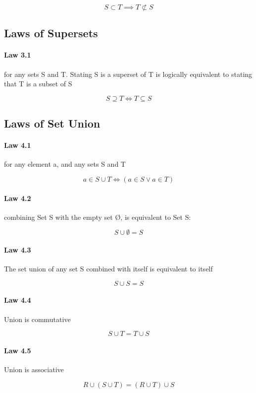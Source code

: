 \documentclass[twocolumn]{article}
\begin{document}
$$ S \subset T \implies T\not\subset S $$

\subsection{Laws of Supersets}

\paragraph{Law 3.1} for any sets S and T. Stating S is a superset of T is logically equivalent to stating that T is a subset of S

$$ S  \supseteq  T \iff T  \subseteq  S $$

\subsection{Laws of Set Union}

\paragraph{Law 4.1} for any element a, and any sets S and T

$$ a  \in  S  \cup  T \iff (a  \in  S \vee a  \in  T) $$

\paragraph{Law 4.2} combining Set S with the empty set Ø, is equivalent to Set S:

$$ S \cup  \emptyset =S $$

\paragraph{Law 4.3} The set union of any set S combined with itself is equivalent to itself

$$ S  \cup  S=S $$

\paragraph{Law 4.4} Union is commutative

$$ S \cup T=T \cup S $$

\paragraph{Law 4.5} Union is associative

$$ R  \cup  (S  \cup  T) = (R  \cup  T)  \cup  S $$
\end{document}

